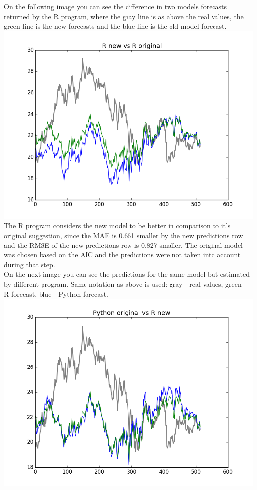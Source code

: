 \documentclass[
  twoside,
  12pt, a4paper,
  footinclude=true,
  headinclude=true,
  cleardoublepage=empty
]{article}
\begin{document}
On the following image you can see the difference in two models forecasts returned by the R program, where the gray line is as above the real values, the green line is the new forecasts and the blue line is the old model forecast.\\
\includegraphics[scale=0.75]{ROriginalVsNew.png}\\
The R program considers the new model to be better in comparison to it's original suggestion, since the MAE is 0.661 smaller by the new predictions row and the RMSE of the new predictions row is 0.827 smaller. The original model was chosen based on the AIC and the predictions were not taken into account during that step.\\
On the next image you can see the predictions for the same model but estimated by different program. Same notation as above is used: gray - real values, green - R forecast, blue - Python forecast.\\
\includegraphics[scale=0.75]{PythonOriginalVsRNew.png}
\end{document}
